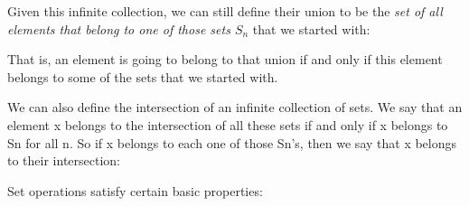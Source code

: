 \documentclass[pdftex, brazil, 12pt, twoside]{article}
\begin{document}
Given this infinite collection, we can still
define their union to be the \emph{set of all elements that
  belong to one of those sets $S_n$} that we started with:

\begin{figure}[H]
  \begin{center}
  \end{center}
\end{figure}

That is, an element is going to belong to that union if and
only if this element belongs to some of the sets that we
started with.

We can also define the intersection of an infinite
collection of sets.
We say that an element x belongs to the intersection of
all these sets if and only if x belongs to Sn for all n.
So if x belongs to each one of those Sn's, then we say that x
belongs to their intersection:

\begin{figure}[H]
  \begin{center}
  \end{center}
\end{figure}

Set operations satisfy certain basic properties:

\begin{figure}[H]
  \begin{center}
  \end{center}
\end{figure}
\end{document}
